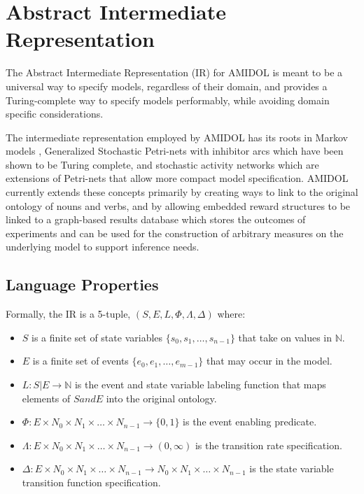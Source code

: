 \documentclass[11pt]{article}
\newcommand{\amidol}{\textsc{AMIDOL}}
\begin{document}
\section{Abstract Intermediate Representation}

The Abstract Intermediate Representation (IR) for \amidol{} is meant to be a universal way to specify models, regardless of their domain, and provides a Turing-complete way to specify models performably, while avoiding domain specific considerations.

The intermediate representation employed by \amidol{} has its roots in Markov models \cite{howard2012dynamic}, Generalized Stochastic Petri-nets with inhibitor arcs \cite{chiola1993generalized} which have been shown to be Turing complete, and stochastic activity networks \cite{movaghar1985performability,sanders2000stochastic} which are extensions of Petri-nets that allow more compact model specification.  \amidol{} currently extends these concepts primarily by creating ways to link to the original ontology of nouns and verbs, and by allowing embedded reward structures to be linked to a graph-based results database which stores the outcomes of experiments and can be used for the construction of arbitrary measures on the underlying model to support inference needs.

\subsection{Language Properties}

Formally, the IR is a 5-tuple, $(S, E, L, \Phi, \Lambda, \Delta)$ where:
\begin{itemize}
\item $S$ is a finite set of state variables $\{s_0, s_1, \ldots, s_{n-1}\}$ that take on values in $\mathbb{N}$.
\item $E$ is a finite set of events $\{e_0, e_1, \ldots, e_{m-1}\}$ that may occur in the model.
\item $L: S|E \rightarrow \mathbb{N}$ is the event and state variable labeling function that maps elements of $S and E$ into the original ontology.
\item $\Phi: E \times N_0 \times N_1 \times \ldots \times N_{n-1} \rightarrow \{0, 1\}$ is the event enabling predicate.
\item $\Lambda: E \times N_0 \times N_1 \times \ldots \times N_{n-1} \rightarrow (0, \infty)$ is the transition rate specification.
\item $\Delta: E \times N_0 \times N_1 \times \ldots \times N_{n-1} \rightarrow N_0 \times N_1 \times \ldots \times N_{n-1}$ is the state variable transition function specification.
\end{itemize}
\end{document}
